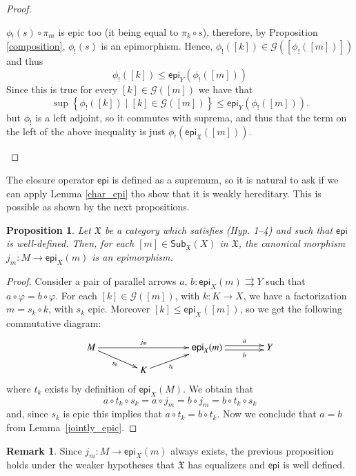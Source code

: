 \documentclass[12pt]{article}
\newtheorem{proposition}[lemma]{Proposition}
\theoremstyle{definition}
\newtheorem{remark}[lemma]{Remark}
\def\X{\mathfrak X}
\def\G{\mathcal{G}}
\numberwithin{equation}{section}
\newcommand{\catname}[1]{\mathbf{#1}}
\newcommand{\sub}[1]{\mathsf{Sub}_{\catname{#1}}}
\def\epi{\mathsf{epi}}
\begin{document}
\begin{proof}
\begin{enumerate}[\rm {(CO.}1)]
		$\phi_!(s)\circ \pi_{m}$ is epic too (it being equal to $\pi_{k}\circ s$), therefore, by Proposition \ref{composition}, $\phi_!(s)$ is an epimorphism. Hence, $\phi_!([k])\in \mathcal{G}([\phi_!([m])])$ and thus
		\[\phi_!([k])\leq \epi_Y(\phi_!([m]))\]
		Since this is true for every $[k]\in \mathcal{G}([m])$ we have that
		\[
		\sup\left\{\phi_!([k]) \mid [k]\in \mathcal{G}([m]) \right\}\leq \epi_Y(\phi_!([m])).
		\]
		but $\phi_!$ is a left adjoint, so it commutes with suprema, and thus that the term on the left of the above inequality is just $\phi_!(\epi_\X([m]))$.\qedhere 
		\end{enumerate}
\end{proof}

The closure operator $\epi$ is defined as a supremum, so it is natural to ask if we can apply Lemma \ref{char_epi} tho show that it is weakly hereditary. This is possible as shown by the next propositions.
\begin{proposition}\label{coro_map_to_epi}
	Let $\X$ be a category which satisfies (Hyp. 1--4) and such that $\epi$ is {well-defined}. Then, for each $[m]\in \sub{\X}(X)$ in $\X$, the canonical morphism $j_m\colon M\to \epi_X(m)$ is an epimorphism.
\end{proposition}
\begin{proof}
	Consider a pair of parallel arrows $a,\,b\colon \epi_X(m)\rightrightarrows Y$ such that $a\circ\varphi=b\circ\varphi$. For each $[k]\in \G([m])$, with $k\colon K\to X$,  we have a factorization $m=s_k\circ k$, with $s_k$ epic. Moreover $[k]\leq \epi_{X}([m])$, so we get the following commutative diagram:
	\[
	\xymatrix@C=40pt@R=10pt{
		M\ar[rd]_{s_k}\ar[rr]^-{j_m}&&\epi_X(m)\ar@<-.5ex>[r]_-{b} \ar@<.5ex>[r]^-{a}&Y\\
		&K\ar@{>}[ur]_-{t_k}
	}
	\]
	where $t_k$ exists by definition of $\epi_X(M)$. We obtain that \[
	a\circ t_k\circ s_k=a\circ j_m=b\circ j_m=b\circ t_k\circ s_k\]
	and, since $s_k$ is epic this implies that $a\circ t_k=b\circ t_k$. Now we conclude that $a=b$ from Lemma~\ref{jointly_epic}.
\end{proof}

\begin{remark}Since $j_m:M\rightarrow \epi_{X}(m)$ always exists, the previous proposition holds under the weaker hypotheses that $\X$ has equalizers and $\epi$ is well defined.
\end{remark}
\end{document}
